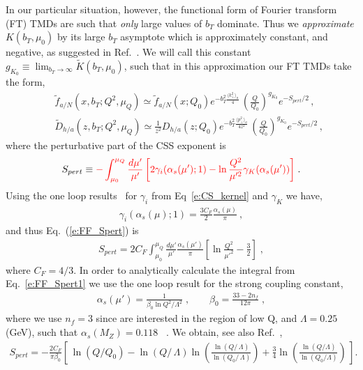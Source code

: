 \documentclass[final,3p,times,onecolumn,sort&compress,hidelinks]{elsarticle}
\newcommand{\crd}{\color{red}}
\begin{document}
In our particular situation, however, the functional form of Fourier transform (FT) TMDs    are such that {\em only} large values of $b_T$  dominate.  
Thus we {\em approximate} $K(b_T,\mu_0)$ by its large $b_T$ asymptote which is approximately  constant, and  negative,
  as suggested in Ref.~\cite{Collins:2014jpa}.
  We will call this constant $g_{K_{0}}\equiv \lim_{b_T\to \infty} \tilde K(b_T,\mu_0)$, such that in this approximation our FT TMDs take the form,
\begin{eqnarray}
&&\tilde f_{a/N} (x,b_T; Q^2, \mu_Q)\simeq \tilde f_{a/N} (x; Q_0) e^{-b_T^2 \frac{\langle k_\perp^2 \rangle_a}{4}}\,\left( \frac{Q}{Q_0}\right)^{g_{K_0}} e^{-S_{pert}/2}\,,
\nonumber \\[0.3cm]
&&\tilde D_{h/a}(z,b_T; Q^2, \mu_Q)\simeq \frac{1}{z^2} D_{h/a}(z; Q_0) e^{-b_T^2 \frac{\langle p_\perp^2 \rangle_a}{4 z^2}}\,\left( \frac{Q}{Q_0}\right)^{g_{K_0}}e^{-S_{pert}/2}\,,
\label{e:FF_ansatz1-evolv}
\end{eqnarray}
where the  perturbative part of the CSS exponent is
\begin{eqnarray}
S_{pert} \equiv {\crd -\int_{\mu_0}^{\mu_Q} \frac{d \mu'}{\mu'}\left[
2 \gamma_i(\alpha_s(\mu');1) -\ln\frac{Q^2}{\mu'^2}\gamma_K(\alpha_s(\mu'))
 \right]} \; .
 \label{e:FF_Spert}
\end{eqnarray}
 Using the  one loop results~\cite{Aybat:2011zv} for $\gamma_i$ from Eq~\eqref{e:CS_kernel} and $\gamma_K$  we have,
\begin{eqnarray}
  \gamma_i(\alpha_s(\mu);1) = \frac{3 C_F}{2}  \frac{\alpha_s(\mu)}{\pi}  \ ,
  \end{eqnarray}
and thus Eq.~(\ref{e:FF_Spert}) is
\begin{eqnarray}
S_{pert} = 2 C_F \int_{\mu_0}^{\mu_Q} \frac{d \mu'}{\mu'} \frac{\alpha_s(\mu')}{\pi} \left[\ln\frac{Q^2}{\mu'^2} - \frac{3}{2}
 \right] \; ,
 \label{e:FF_Spert1}
\end{eqnarray}
where $C_F = 4/3$. In order to {\crd analytically calculate} the integral from Eq.~\eqref{e:FF_Spert1} we   use the one loop result for the strong coupling constant, 
\begin{eqnarray}
\alpha_s(\mu') = \frac{1}{\beta_0 \ln Q^2/\Lambda^2} \; , \quad\quad
\beta_0 = \frac{33-2 n_f}{12 \pi}\; ,
 \label{e:as}
\end{eqnarray}
where we use $n_f=3$ since are interested in the region of low Q, and $\Lambda = 0.25$ (GeV), such that $\alpha_s(M_Z)= 0.118$ ~\cite{Bethke:2012jm}. We obtain, see also Ref.~\cite{Aidala:2014hva},
\begin{eqnarray}
    S_{pert} = -\frac{2 C_F}{\pi \beta_0}\left[\, \ln\left(Q/Q_0\right)
  - \ln\left(Q/\, \Lambda\right) \ln\left(\frac{\ln\left(Q/\,\Lambda\right)}
  {\ln\left(Q_0/\, \Lambda\right)}\right) +
\frac{3}{4} \ln \left(\frac{\ln\left(Q/\Lambda\right)}{\ln\left(Q_0/\Lambda\right)} \right)\, \right].
 \label{e:FF_Spert_analytical}
\end{eqnarray}
\end{document}
